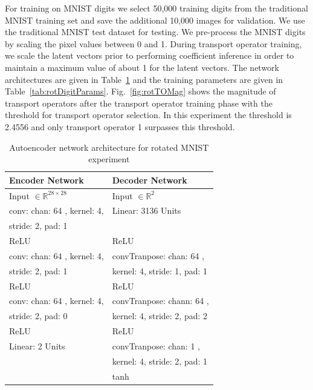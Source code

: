 \documentclass[letterpaper]{article} %
\begin{document}
For training on MNIST digits we select 50,000 training digits from the traditional MNIST training set and save the additional 10,000 images for validation. We use the traditional MNIST test dataset for testing. We pre-process the MNIST digits by scaling the pixel values between 0 and 1. During transport operator training, we scale the latent vectors prior to performing coefficient inference in order to maintain a maximum value of about 1 for the latent vectors. The network architectures are given in Table~\ref{tab:rotDigitNet} and the training parameters are given in Table~\ref{tab:rotDigitParams}. Fig.~\ref{fig:rotTOMag} shows the magnitude of transport operators after the transport operator training phase with the threshold for transport operator selection. In this experiment the threshold is 2.4556 and only transport operator 1 surpasses this threshold.

\begin{table}[t]
\centering
\begin{tabular}{||l l||}
 \hline
 Encoder Network & Decoder Network  \\
 \hline
 Input $\in \mathbb{R}^{28 \times 28}$ & Input $\in \mathbb{R}^2$  \\
 conv: chan: 64 , kernel: 4,  & Linear: 3136 Units  \\
 stride: 2, pad: 1 & \\
 ReLU & ReLU \\
 conv: chan: 64 , kernel: 4,  & convTranpose: chan: 64 ,   \\
 stride: 2, pad: 1 & kernel: 4, stride: 1, pad: 1 \\
 ReLU & ReLU \\
 conv: chan: 64 , kernel: 4,  & convTranpose: chann: 64 ,   \\
 stride: 2, pad: 0 & kernel: 4, stride: 2, pad: 2 \\
 ReLU & ReLU \\
 Linear: 2 Units & convTranpose: chan: 1 ,   \\
  & kernel: 4, stride: 2, pad: 1 \\
   & tanh \\
 \hline
\end{tabular}
\caption{Autoencoder network architecture for rotated MNIST experiment}
\label{tab:rotDigitNet}
\end{table}
\end{document}
